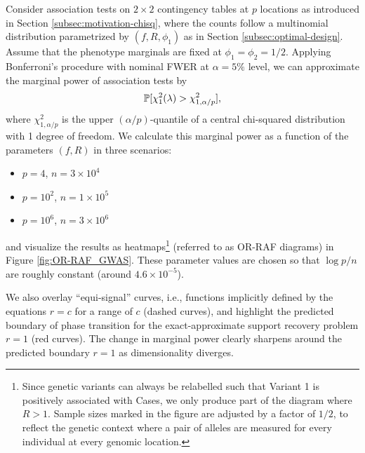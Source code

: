 \begin{example}
\label{exmp:OR-RAF_phase_transition}
Consider association tests on $2\times2$ contingency tables at $p$ locations as introduced in Section \ref{subsec:motivation-chisq}, where the counts follow 
a multinomial distribution
parametrized by $(f, R, \phi_1)$ as in Section \ref{subsec:optimal-design}.
Assume that the phenotype marginals are fixed at $\phi_1 = \phi_2 = 1/2$.
Applying Bonferroni's procedure with nominal FWER at $\alpha=5\%$ level, we can approximate the marginal power of association tests by
\begin{equation} \label{eq:power-approximation}
    \P[\chi^2_{1}(\lambda)>\chi^2_{1,\alpha/p}],
\end{equation}
where $\chi^2_{1,\alpha/p}$ is the upper $(\alpha/p)$-quantile of a central chi-squared distribution with 1 degree of freedom.
We calculate this marginal power as a function of the parameters $(f,R)$ in three scenarios:
\begin{itemize}
    \item $p=4$, $n=3\times10^4$ 
    \item $p=10^2$, $n=1\times10^5$
    \item $p=10^6$, $n=3\times10^6$
\end{itemize}
and visualize the results as heatmaps\footnote{Since genetic variants can always be relabelled such that Variant 1 is positively associated with Cases, we only produce part of the diagram where $R>1$.
Sample sizes marked in the figure are adjusted by a factor of $1/2$, to reflect the genetic context where a pair of alleles are measured for every individual at every genomic location.} (referred to as OR-RAF diagrams) in Figure \ref{fig:OR-RAF_GWAS}.
These parameter values are chosen so that $\log{p}/n$ are roughly constant (around $4.6\times10^{-5}$).

We also overlay ``equi-signal'' curves, i.e., functions implicitly defined by the equations $r=c$ for a range of $c$ (dashed curves), and highlight the predicted boundary of phase transition for the exact-approximate support recovery problem $r=1$ (red curves).
The change in marginal power clearly sharpens around the predicted boundary $r=1$ as dimensionality diverges.
\end{example}



